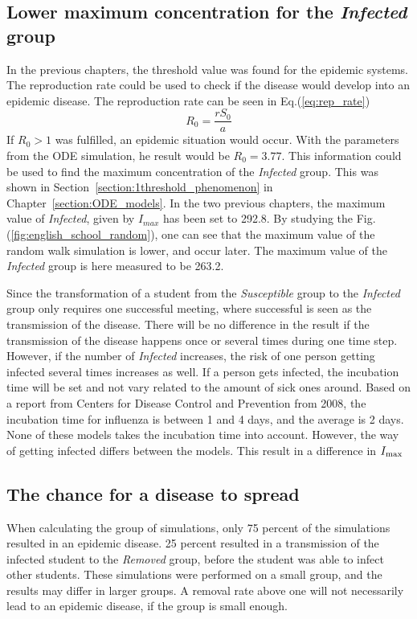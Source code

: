 \documentclass[%
twoside,                 %
final,                   %
chapterprefix=true,      %
open=right               %
10pt]{book}
\begin{document}
\subsection{Lower maximum concentration for the \emph{Infected} group}
In the previous chapters, the threshold value was found for the epidemic systems. The reproduction rate could be used to check if the disease would develop into an epidemic disease. The reproduction rate can be seen in Eq.(\ref{eq:rep_rate})
\begin{equation} \label{eq:rep_rate}
R_0 = \frac{rS_0}{a}
\end{equation}
If $R_0> 1$ was fulfilled, an epidemic situation would occur. With the parameters from the ODE simulation, he result would be $R_0 = 3.77$. This information could be used to find the maximum concentration of the \emph{Infected} group. This was shown in Section~\ref{section:1threshold_phenomenon} in Chapter~\ref{section:ODE_models}. In the two previous chapters, the maximum value of \emph{Infected}, given by $I_{max}$ has been set to 292.8. By studying the Fig.(\ref{fig:english_school_random}), one can see that the maximum value of the random walk simulation is lower, and occur later. The maximum value of the \emph{Infected} group is here measured to be 263.2. 


\vspace{3mm}




\vspace{3mm}


Since the transformation of a student from the \emph{Susceptible} group to the \emph{Infected} group only requires one successful meeting, where successful is seen as the transmission of the disease. There will be no difference in the result if the transmission of the disease happens once or several times during one time step. However, if the number of \emph{Infected} increases, the risk of one person getting infected several times increases as well. If a person gets infected, the incubation time will be set and not vary related to the amount of sick ones around. Based on a report from Centers for Disease Control and Prevention from 2008, the incubation time for influenza is between 1 and 4 days, and the average is 2 days. None of these models takes the incubation time into account. However, the way of getting infected differs between the models. This result in a difference in $I_{\textrm{max}}$ 

\subsection{The chance for a disease to spread}
When calculating the group of simulations, only 75 percent of the simulations resulted in an epidemic disease. 25 percent resulted in a transmission of the infected student to the \emph{Removed} group, before the student was able to infect other students. These simulations were performed on a small group, and the results may differ in larger groups. A removal rate above one will not necessarily lead to an epidemic disease, if the group is small enough.
\end{document}
